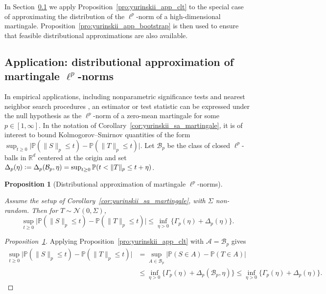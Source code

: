 \documentclass[11pt,lof]{puthesis}
\renewcommand{\P}{\ensuremath{\mathbb{P}}}
\newcommand{\R}{\ensuremath{\mathbb{R}}}
\newcommand{\cN}{\ensuremath{\mathcal{N}}}
\newcommand{\cB}{\ensuremath{\mathcal{B}}}
\newcommand{\cA}{\ensuremath{\mathcal{A}}}
\theoremstyle{break}
\newtheorem{proposition}{Proposition}[section]
\theoremstyle{proof}
\newtheorem{proof}{Proof}
\begin{document}
In Section~\ref{sec:yurinskii_app_lp} we apply
Proposition~\ref{pro:yurinskii_app_clt} to the special case
of approximating the distribution of the $\ell^p$-norm of a high-dimensional
martingale. Proposition~\ref{pro:yurinskii_app_bootstrap} is then used to
ensure that
feasible distributional approximations are also available.

\subsection{Application: distributional approximation of martingale
\texorpdfstring{$\ell^p$}{lp}-norms}
\label{sec:yurinskii_app_lp}

In empirical applications,
including nonparametric significance tests
\citep{lopes2020bootstrapping}
and nearest neighbor search procedures
\citep{biau2015high},
an estimator or test statistic
can be expressed under the null hypothesis
as the $\ell^p$-norm of a zero-mean
martingale for some $p \in [1, \infty]$.
In the notation of Corollary~\ref{cor:yurinskii_sa_martingale},
it is of interest to bound Kolmogorov--Smirnov
quantities of the form
$\sup_{t \geq 0} \big| \P( \|S\|_p \leq t) - \P( \|T\|_p \leq t) \big|$.
Let $\cB_p$ be the class of closed $\ell^p$-balls in $\R^d$ centered at the
origin and set
$\Delta_p(\eta) \vcentcolon= \Delta_p(\cB_p, \eta)
= \sup_{t \geq 0} \P( t < \|T\|_p \leq t + \eta )$.

\begin{proposition}[Distributional approximation of
  martingale $\ell^p$-norms]
  \label{pro:yurinskii_app_application_lp}

  Assume the setup of Corollary~\ref{cor:yurinskii_sa_martingale},
  with $\Sigma$ non-random. Then for $T \sim \cN(0, \Sigma)$,
  \begin{equation}%
    \label{eq:yurinskii_app_application_lp}
    \sup_{t \geq 0}
    \big| \P( \|S\|_p \leq t )
    - \P\left( \|T\|_p \leq t \right) \big|
    \leq \inf_{\eta>0}
    \big\{\Gamma_p(\eta) + \Delta_p(\eta) \big\}.
  \end{equation}
\end{proposition}

\begin{proof}[Proposition~\ref{pro:yurinskii_app_application_lp}]

  Applying Proposition~\ref{pro:yurinskii_app_clt}
  with $\cA=\cB_p$ gives
  \begin{align*}
    \sup_{t \geq 0}
    \big| \P( \|S\|_p \leq t )
    - \P\left( \|T\|_p \leq t \right) \big|
    &= \sup_{A\in \cB_p}
    \big|\P(S\in A) -\P(T\in A)\big| \\
    &\leq
    \inf_{\eta>0}
    \big\{\Gamma_p(\eta) + \Delta_p(\cB_p, \eta) \big\}
    \leq
    \inf_{\eta>0}
    \big\{\Gamma_p(\eta) + \Delta_p(\eta) \big\}.
  \end{align*}
\end{proof}
\end{document}

